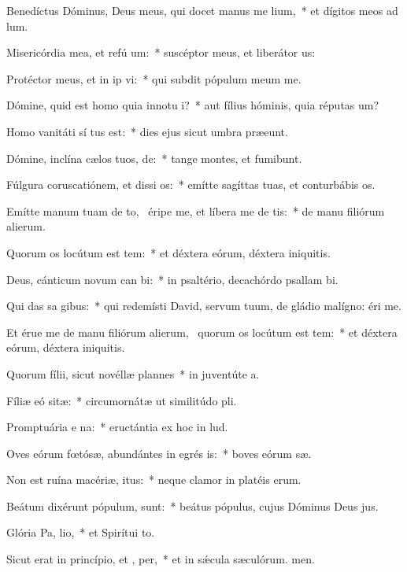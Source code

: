 \item Benedíctus Dóminus, Deus meus, qui docet manus me  lium,~* et dígitos meos ad lum.
\item Misericórdia mea, et refú um:~* suscéptor meus, et liberátor us:
\item Protéctor meus, et in ip vi:~* qui subdit pópulum meum  me.
\item Dómine, quid est homo quia innotu i?~* aut fílius hóminis, quia réputas um?
\item Homo vanitáti sí tus est:~* dies ejus sicut umbra præeunt.
\item Dómine, inclína cælos tuos,  de:~* tange montes, et fumibunt.
\item Fúlgura coruscatiónem, et dissi os:~* emítte sagíttas tuas, et conturbábis os.
\item Emítte manum tuam de to,~\pscross{} éripe me, et líbera me de  tis:~* de manu filiórum alierum.
\item Quorum os locútum est tem:~* et déxtera eórum, déxtera iniquitis.
\item Deus, cánticum novum can bi:~* in psaltério, decachórdo psallam bi.
\item Qui das sa gibus:~* qui redemísti David, servum tuum, de gládio malígno: éri me.
\item Et érue me de manu filiórum alierum,~\pscross{} quorum os locútum est tem:~* et déxtera eórum, déxtera iniquitis.
\item Quorum fílii, sicut novéllæ plannes~* in juventúte a.
\item Fíliæ eó sitæ:~* circumornátæ ut similitúdo pli.
\item Promptuária e na:~* eructántia ex hoc in lud.
\item Oves eórum fœtósæ, abundántes in egrés is:~* boves eórum sæ.
\item Non est ruína macériæ,  itus:~* neque clamor in platéis erum.
\item Beátum dixérunt pópulum,   sunt:~* beátus pópulus, cujus Dóminus Deus jus.
\item Glória Pa,  lio,~* et Spirítui to.
\item Sicut erat in princípio, et ,  per,~* et in sǽcula sæculórum. men.
